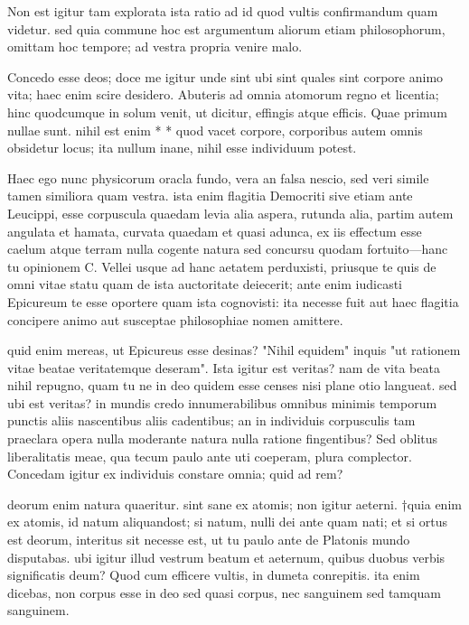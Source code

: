  Non est igitur tam explorata ista ratio ad id quod vultis confirmandum quam videtur. sed quia commune hoc est argumentum aliorum etiam philosophorum, omittam hoc tempore; ad vestra propria venire malo.

 Concedo esse deos; doce me igitur unde sint ubi sint quales sint corpore animo vita; haec enim scire desidero. Abuteris ad omnia atomorum regno et licentia; hinc quodcumque in solum venit, ut dicitur, effingis atque efficis. Quae primum nullae sunt. nihil est enim * * quod vacet corpore, corporibus autem omnis obsidetur locus; ita nullum inane, nihil esse individuum potest.

 Haec ego nunc physicorum oracla fundo, vera an falsa nescio, sed veri simile tamen similiora quam vestra. ista enim flagitia Democriti sive etiam ante Leucippi, esse corpuscula quaedam levia alia aspera, rutunda alia, partim autem angulata et hamata, curvata quaedam et quasi adunca, ex iis effectum esse caelum atque terram nulla cogente natura sed concursu quodam fortuito—hanc tu opinionem C. Vellei usque ad hanc aetatem perduxisti, priusque te quis de omni vitae statu quam de ista auctoritate deiecerit; ante enim iudicasti Epicureum te esse oportere quam ista cognovisti: ita necesse fuit aut haec flagitia concipere animo aut susceptae philosophiae nomen amittere.

 quid enim mereas, ut Epicureus esse desinas? "Nihil equidem" inquis "ut rationem vitae beatae veritatemque deseram". Ista igitur est veritas? nam de vita beata nihil repugno, quam tu ne in deo quidem esse censes nisi plane otio langueat. sed ubi est veritas? in mundis credo innumerabilibus omnibus minimis temporum punctis aliis nascentibus aliis cadentibus; an in individuis corpusculis tam praeclara opera nulla moderante natura nulla ratione fingentibus? Sed oblitus liberalitatis meae, qua tecum paulo ante uti coeperam, plura complector. Concedam igitur ex individuis constare omnia; quid ad rem?

 deorum enim natura quaeritur. sint sane ex atomis; non igitur aeterni. †quia enim ex atomis, id natum aliquandost; si natum, nulli dei ante quam nati; et si ortus est deorum, interitus sit necesse est, ut tu paulo ante de Platonis mundo disputabas. ubi igitur illud vestrum beatum et aeternum, quibus duobus verbis significatis deum? Quod cum efficere vultis, in dumeta conrepitis. ita enim dicebas, non corpus esse in deo sed quasi corpus, nec sanguinem sed tamquam sanguinem.

